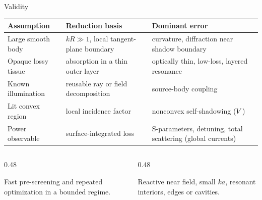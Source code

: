 \documentclass[aspectratio=169,10pt]{beamer}
\begin{document}
\begin{frame}{Validity}
  \vspace{2pt}
  \small
  \begin{tabularx}{\linewidth}{@{}p{29mm} >{\raggedright\arraybackslash}X >{\raggedright\arraybackslash}X@{}}
    \toprule
    \textbf{Assumption} & \textbf{Reduction basis} & \textbf{Dominant error} \\
    \midrule
    Large smooth body & $kR\gg1$, local tangent-plane boundary & curvature, diffraction near shadow boundary \\
    Opaque lossy tissue & absorption in a thin outer layer & optically thin, low-loss, layered resonance \\
    Known illumination & reusable ray or field decomposition & source-body coupling \\
    Lit convex region & local incidence factor & nonconvex self-shadowing ($V$) \\
    Power observable & surface-integrated loss & S-parameters, detuning, total scattering (global currents) \\
    \bottomrule
  \end{tabularx}
  \vspace{9pt}
  \pause
  \begin{columns}[T]
    \begin{column}{0.48\textwidth}
      \begin{evidencebox}
        \centering\footnotesize Fast pre-screening and repeated optimization in a bounded regime.
      \end{evidencebox}
    \end{column}
    \begin{column}{0.48\textwidth}
      \begin{limitbox}[Escalation]
        \centering\footnotesize Reactive near field, small $ka$, resonant interiors, edges or cavities.
      \end{limitbox}
    \end{column}
  \end{columns}
\end{frame}
\end{document}
